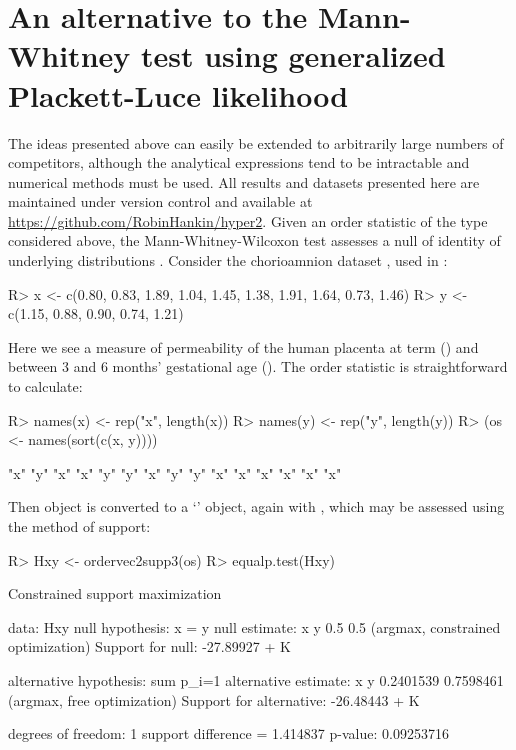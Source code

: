\documentclass[article]{jss}
\begin{document}
\section{An alternative to the Mann-Whitney test using generalized Plackett-Luce likelihood}

The ideas presented above can easily be extended to arbitrarily large
numbers of competitors, although the analytical expressions tend to be
intractable and numerical methods must be used.  All results and
datasets presented here are maintained under version control and
available at \url{https://github.com/RobinHankin/hyper2}.  Given an
order statistic of the type considered above, the
Mann-Whitney-Wilcoxon test \citep{mann1947,wilcoxon1945} assesses a
null of identity of underlying distributions \citep{ahmad1996}.
Consider the chorioamnion dataset \citep{hollander2013}, used in
:
%
\begin{Schunk}
\begin{Sinput}
R> x <- c(0.80, 0.83, 1.89, 1.04, 1.45, 1.38, 1.91, 1.64, 0.73, 1.46)
R> y <- c(1.15, 0.88, 0.90, 0.74, 1.21)
\end{Sinput}
\end{Schunk}
%
Here we see a measure of permeability of the human placenta at term
() and between 3 and 6 months' gestational age ().
The order statistic is straightforward to calculate:
%
\begin{Schunk}
\begin{Sinput}
R> names(x) <- rep("x", length(x))
R> names(y) <- rep("y", length(y))
R> (os <- names(sort(c(x, y))))
\end{Sinput}
\begin{Soutput}
 [1] "x" "y" "x" "x" "y" "y" "x" "y" "y" "x" "x" "x" "x" "x" "x"
\end{Soutput}
\end{Schunk}
%
Then object  is converted to a `' object, again
with , which may be assessed using the method
of support:
%
\begin{Schunk}
\begin{Sinput}
R> Hxy <- ordervec2supp3(os)
R> equalp.test(Hxy)
\end{Sinput}
\begin{Soutput}
	Constrained support maximization

data:  Hxy
null hypothesis: x = y
null estimate:
  x   y 
0.5 0.5 
(argmax, constrained optimization)
Support for null:  -27.89927 + K

alternative hypothesis:  sum p_i=1 
alternative estimate:
        x         y 
0.2401539 0.7598461 
(argmax, free optimization)
Support for alternative:  -26.48443 + K

degrees of freedom: 1
support difference = 1.414837
p-value: 0.09253716 
\end{Soutput}
\end{Schunk}
\end{document}
